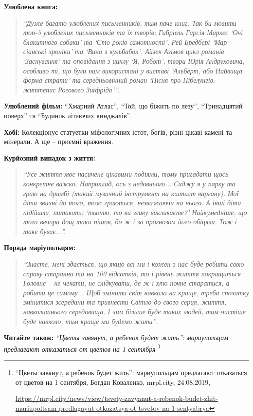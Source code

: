 \textbf{Улюблена книга:} 

\begin{quote}
\em\enquote{Дуже багато улюблених письменників, тим паче книг. Так би
мовити топ-5 улюблених письменників та їх творів: Габріель Гарсія Маркес \enquote{Очі
блакитного собаки} та \enquote{Сто років самотності}, Рей Бредбері \enquote{Мар\hyp{}сіанські хроніки}
та \enquote{Вино з кульбабок}, Айзек Азімов цикл романів \enquote{Заснування} та оповідання з
циклу \enquote{Я, Робот}, твори Юрія Андруховича, особливо ті, що були ним використані
у виставі \enquote{Альберт, або Найвища форма страти} та середньовічний роман \enquote{Пісня
про Нібелунгів: життєпис Рогового Зиґфріда}}.
\end{quote}


\textbf{Улюблений фільм:} \enquote{Хмарний Атлас}, \enquote{Той, що біжить по лезу}, \enquote{Тринадцятий
поверх} та \enquote{Будинок літаючих кинджалів}.

\textbf{Хобі:} Колекціонує статуетки міфологічних істот, богів, різні цікаві камені та
мінерали. А ще – приємні враження.

\textbf{Курйозний випадок з життя:} 

\begin{quote}
\em\enquote{Усе життя моє насичене цікавими подіями, тому
пригадати щось конкретне важко. Наприклад, ось з недавнього... Сиджу я у парку
та граю на дримбі (такий музичний інструмент на кшталт варгану). Мої діти
звичні до того, тож граються, незважаючи на нього. А інші діти підійшли,
питають: \enquote{тьотю, то ви зливу викликаєте?} Найкумедніше, що того вечора дощ
таки пішов, бо ж і за прогнозом його обіцяли. Тож і таке буває...}.
\end{quote}


\textbf{Порада маріупольцям:} 

\begin{quote}
\em\enquote{Знаєте, мені здається, що якщо всі ми і кожен з нас буде
робити свою справу старанно та на 100 відсотків, то і рівень життя покращиться.
Головне – не чекати, не слідкувати, де ж і хто почне старатися, а робити це
самому... Щоб змінити світ навколо на краще, треба спочатку змінитися зсередини
та привнести Світло до свого серця, життя, навколишнього середовища. І чим
більше буде таких людей, тим чистіше буде навколо, тим краще ми будемо жити}.
\end{quote}

\textbf{Читайте також:} \emph{\enquote{Цветы завянут, а ребенок будет жить}: мариупольцам предлагают отказаться от цветов на 1 сентября}%
\footnote{\enquote{Цветы завянут, а ребенок будет жить}: мариупольцам предлагают отказаться от цветов на 1 сентября, Богдан Коваленко, mrpl.city, 24.08.2019, \par\url{https://mrpl.city/news/view/tsvety-zavyanut-a-rebenok-budet-zhit-mariupoltsam-predlagayut-otkazatsya-ot-tsvetov-na-1-sentyabrya}}
